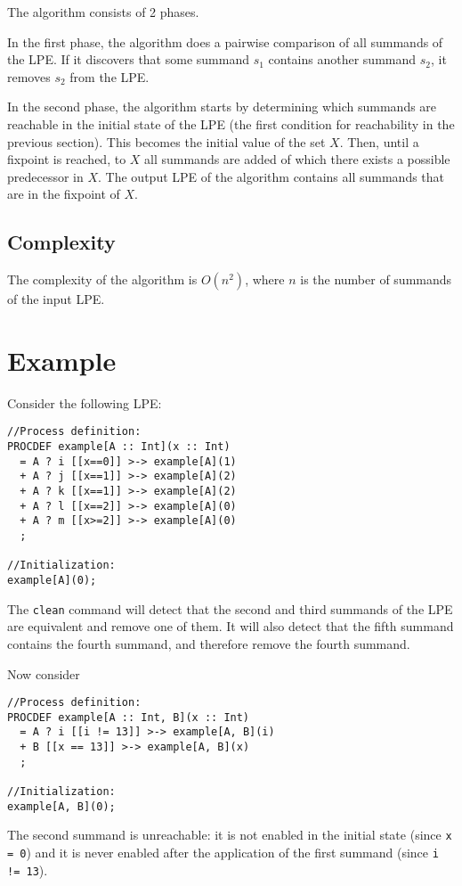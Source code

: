 The algorithm consists of 2 phases.

In the first phase, the algorithm does a pairwise comparison of all summands of the LPE.
If it discovers that some summand $s_1$ contains another summand $s_2$, it removes $s_2$ from the LPE.

In the second phase, the algorithm starts by determining which summands are reachable in the initial state of the LPE (the first condition for reachability in the previous section).
This becomes the initial value of the set $X$.
Then, until a fixpoint is reached, to $X$ all summands are added of which there exists a possible predecessor in $X$.
The output LPE of the algorithm contains all summands that are in the fixpoint of $X$.

\subsection{Complexity}

The complexity of the algorithm is $O(n^2)$, where $n$ is the number of summands of the input LPE.

\section{Example}

Consider the following LPE:

\begin{lstlisting}
//Process definition:
PROCDEF example[A :: Int](x :: Int)
  = A ? i [[x==0]] >-> example[A](1)
  + A ? j [[x==1]] >-> example[A](2)
  + A ? k [[x==1]] >-> example[A](2)
  + A ? l [[x==2]] >-> example[A](0)
  + A ? m [[x>=2]] >-> example[A](0)
  ;

//Initialization:
example[A](0);
\end{lstlisting}

The \texttt{clean} command will detect that the second and third summands of the LPE are equivalent and remove one of them.
It will also detect that the fifth summand contains the fourth summand, and therefore remove the fourth summand.

Now consider

\begin{lstlisting}
//Process definition:
PROCDEF example[A :: Int, B](x :: Int)
  = A ? i [[i != 13]] >-> example[A, B](i)
  + B [[x == 13]] >-> example[A, B](x)
  ;

//Initialization:
example[A, B](0);
\end{lstlisting}

The second summand is unreachable: it is not enabled in the initial state (since \texttt{x = 0}) and it is never enabled after the application of the first summand (since \texttt{i != 13}).

